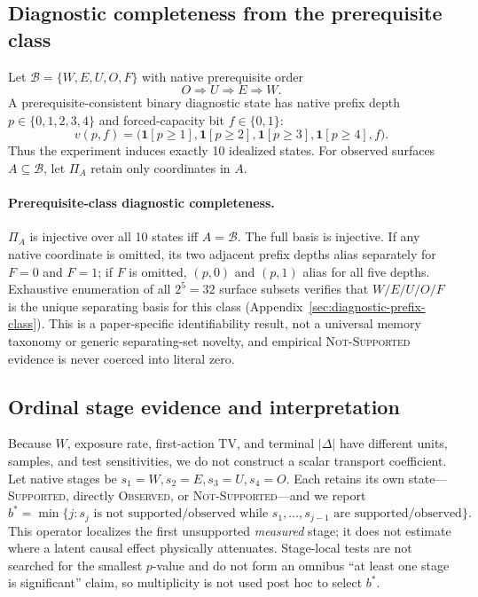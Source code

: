 \subsection{Diagnostic completeness from the prerequisite class}
\label{sec:diagnostic-completeness}
Let $\mathcal{B}=\{W,E,U,O,F\}$ with native prerequisite order
\[
 O\Rightarrow U\Rightarrow E\Rightarrow W.
\]
A prerequisite-consistent binary diagnostic state has native prefix depth $p\in\{0,1,2,3,4\}$ and forced-capacity bit $f\in\{0,1\}$:
\[
 v(p,f)=\big(\mathbf{1}[p\ge1],\mathbf{1}[p\ge2],\mathbf{1}[p\ge3],\mathbf{1}[p\ge4],f\big).
\]
Thus the experiment induces exactly 10 idealized states. For observed surfaces $A\subseteq\mathcal{B}$, let $\Pi_A$ retain only coordinates in $A$.

\paragraph{Prerequisite-class diagnostic completeness.} $\Pi_A$ is injective over all 10 states iff $A=\mathcal{B}$. The full basis is injective. If any native coordinate is omitted, its two adjacent prefix depths alias separately for $F=0$ and $F=1$; if $F$ is omitted, $(p,0)$ and $(p,1)$ alias for all five depths. Exhaustive enumeration of all $2^5=32$ surface subsets verifies that $W/E/U/O/F$ is the unique separating basis for this class (Appendix~\ref{sec:diagnostic-prefix-class}). This is a paper-specific identifiability result, not a universal memory taxonomy or generic separating-set novelty, and empirical \textsc{Not-Supported} evidence is never coerced into literal zero.

\subsection{Ordinal stage evidence and interpretation}
\label{sec:evidence-ladder}
Because $W$, exposure rate, first-action TV, and terminal $|\Delta|$ have different units, samples, and test sensitivities, we do not construct a scalar transport coefficient. Let native stages be $s_1=W,s_2=E,s_3=U,s_4=O$. Each retains its own state---\textsc{Supported}, directly \textsc{Observed}, or \textsc{Not-Supported}---and we report
\[
 b^*=\min\{j:s_j\text{ is not supported/observed while }s_1,\ldots,s_{j-1}\text{ are supported/observed}\}.
\]
This operator localizes the first unsupported \emph{measured} stage; it does not estimate where a latent causal effect physically attenuates. Stage-local tests are not searched for the smallest $p$-value and do not form an omnibus ``at least one stage is significant'' claim, so multiplicity is not used post hoc to select $b^*$.

